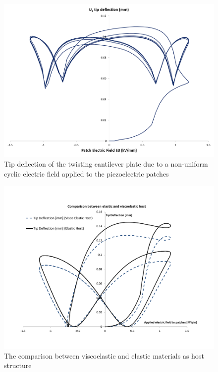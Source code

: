 \begin{figure} 
\centering
\includegraphics[width=5.0in]{./chap_2_pol_sw/figures/Fig14_tiptwistingcompositeactivebeam.png}
\caption{Tip deflection of the twisting cantilever plate due to a non-uniform cyclic electric field applied to the piezoelectric patches}
\label{fig:Fig14_tiptwistingcompositeactivebeam} 
\end{figure}

\begin{figure} 
\centering
\includegraphics[width=5.0in]{./chap_2_pol_sw/figures/ViscoHostCompositeActiveBeam.pdf}
\caption{The comparison between viscoelastic and elastic materials as host structure}
\label{fig:ViscoHostCompositeActiveBeam}
\end{figure}

\newpage 